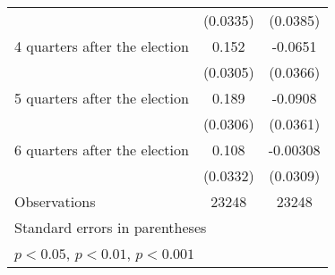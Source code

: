 \begin{table}[htbp]
\begin{tabular}{l*{2}{c}}
                    &    (0.0335)         &    (0.0385)         \\
[1em]
 4 quarters after the election&       0.152\sym{***}&     -0.0651         \\
                    &    (0.0305)         &    (0.0366)         \\
[1em]
 5 quarters after the election&       0.189\sym{***}&     -0.0908\sym{*}  \\
                    &    (0.0306)         &    (0.0361)         \\
[1em]
 6 quarters after the election&       0.108\sym{**} &    -0.00308         \\
                    &    (0.0332)         &    (0.0309)         \\
\hline
Observations        &       23248         &       23248         \\
\hline\hline
\multicolumn{3}{l}{\footnotesize Standard errors in parentheses}\\
\multicolumn{3}{l}{\footnotesize \sym{*} \(p<0.05\), \sym{**} \(p<0.01\), \sym{***} \(p<0.001\)}\\
\end{tabular}
\end{table}
